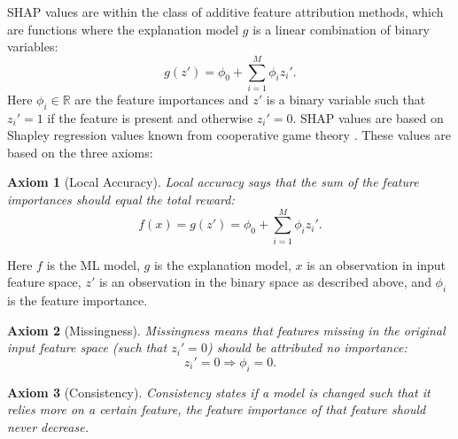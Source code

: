 \documentclass[a4paper, twoside, nobib]{tufte-book}
\newtheorem{axiom}{Axiom}
\newcommand{\autocite}[1]{\citep{#1}}
\begin{document}
SHAP values are within the class of additive feature attribution methods, which are functions where the explanation model $g$ is a linear combination of binary variables:
\begin{equation}
  \label{eq:ml:additive_feature_attribution_method}
  g(z') = \phi_0 + \sum_{i=1}^M \phi_i z_i'.
\end{equation}
Here $\phi_i \in \mathbb{R}$ are the feature importances and $z'$ is a binary variable such that $z_i'=1$ if the feature is present and otherwise $z_i' = 0$. SHAP values are based on Shapley regression values known from cooperative game theory \autocite{Shapley1953}. These values are based on the three axioms:
\begin{axiom}[Local Accuracy]
  Local accuracy says that the sum of the feature importances should equal the total reward:
  \begin{equation}
    f(x) = g(z') = \phi_0 + \sum_{i=1}^M \phi_i z_i'.
  \end{equation}
\end{axiom}
Here $f$ is the ML model, $g$ is the explanation model, $x$ is an observation in input feature space, $z'$ is an observation in the binary space as described above, and $\phi_i$ is the feature importance. 
\begin{axiom}[Missingness]
  Missingness means that features missing in the original input feature space (such that $z_i'=0$) should be attributed no importance:
  \begin{equation}
    z_i' = 0 \Rightarrow \phi_i = 0.
  \end{equation} 
\end{axiom}
\begin{axiom}[Consistency]
  \label{axiom:ml:shap_consistency}
  Consistency states if a model is changed such that it relies more on a certain feature, the feature importance of that feature should never decrease. 
\end{axiom}
\end{document}
